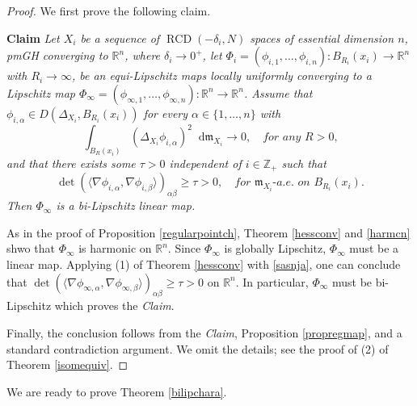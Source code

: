 \documentclass[11pt,reqno]{amsart}
\theoremstyle{definition}
\numberwithin{equation}{section}
\newcommand{\dR}{\mathbb{R}}
\newcommand{\dZ}{\mathbb{Z}}
\newcommand{\di}{\mathop{}\!\mathrm{d}}
\newcommand{\meas}{\mathfrak{m}}
\DeclareMathOperator{\RCD}{RCD}
\begin{document}
\begin{proof}

We first prove the following claim.

\smallskip

       
\textbf{Claim} \textit{Let $X_i$ be a sequence of $\RCD(-\delta_i, N)$ spaces of essential dimension $n$, pmGH converging to $\mathbb{R}^n$, where $\delta_i \to 0^+$, let $\Phi_i=(\phi_{i, 1},\ldots,\phi_{i,n}):B_{R_i}(x_i) \to \mathbb{R}^n$ with $R_i \to \infty$,  be an equi-Lipschitz maps locally uniformly converging to a Lipschitz map $\Phi_{\infty} = (\phi_{\infty, 1}, \ldots, \phi_{\infty, n}): \dR^n \to \dR^n$.  Assume that $\phi_{i, \alpha} \in D(\Delta_{X_i}, B_{R_i}(x_i))$ for every $\alpha\in\{1,\ldots, n\}$ with
\begin{equation}\label{harmcn}
\int_{B_R(x_i)}(\Delta_{X_i} \phi_{i,\alpha})^2\di \meas_{X_i}\to 0,\quad \textit{for any $R>0$,}
        \end{equation}
        and that there exists some $\tau > 0$ independent of $i \in \dZ_+$ such that 
         \begin{equation}\label{sasnja}
            \det(\langle \nabla \phi_{i, \alpha}, \nabla \phi_{i, \beta}\rangle)_{\alpha \beta} \ge \tau>0,\quad \textit{for $\meas_{X_i}$-a.e. on $B_{R_i}(x_i)$}.
        \end{equation}
        Then $\Phi_{\infty}$ is a bi-Lipschitz linear map. 
}

\smallskip


 As in the proof of Proposition \ref{regularpointch}, Theorem \ref{hessconv} and \eqref{harmcn} shwo that $\Phi_{\infty}$ is harmonic on $\mathbb{R}^n$. Since $\Phi_{\infty}$ is globally Lipschitz,   
$\Phi_{\infty}$ must be a linear map. 
    Applying (1) of Theorem \ref{hessconv} with \eqref{sasnja}, one can conclude that
    $
        \det(\langle \nabla \phi_{\infty, \alpha}, \nabla \phi_{\infty, \beta}\rangle)_{\alpha \beta} \ge \tau>0$ on $\mathbb{R}^n$.
    In particular, $\Phi_{\infty}$ must be bi-Lipschitz which proves the \textit{Claim}.

Finally,
    the conclusion follows from the \textit{Claim}, Proposition \ref{propregmap}, and a standard contradiction argument. We omit the details; see the proof of (2) of Theorem \ref{isomequiv}.
\end{proof}

We are ready to prove Theorem \ref{bilipchara}.
\end{document}

